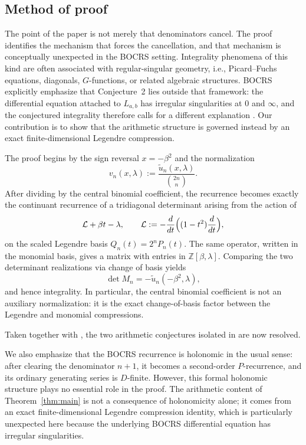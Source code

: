 \documentclass[11pt,letterpaper]{amsart}
\numberwithin{equation}{section}
\theoremstyle{plain}
\theoremstyle{remark}
\newcommand{\Z}{\mathbb{Z}}
\begin{document}
\subsection*{Method of proof}
The point of the paper is not merely that denominators cancel. The proof identifies the
mechanism that forces the cancellation, and that mechanism is conceptually unexpected in the
BOCRS setting. Integrality phenomena of this kind are often associated with regular-singular
geometry, i.e., Picard--Fuchs equations, diagonals, \(G\)-functions, or related algebraic
structures. BOCRS explicitly emphasize that Conjecture~2 lies outside that framework: the
differential equation attached to \(L_{a,b}\) has irregular singularities at \(0\) and
\(\infty\), and the conjectured integrality therefore calls for a different explanation
\cite[\S4,\S10.3]{BOCRS}. Our contribution is to show that the arithmetic structure is
governed instead by an exact finite-dimensional Legendre compression.

The proof begins by the sign reversal \(x=-\beta^2\) and the normalization
\[
v_n(x,\lambda):=\frac{\widetilde u_n(x,\lambda)}{\binom{2n}{n}}.
\]
After dividing by the central binomial coefficient, the recurrence becomes exactly the
continuant recurrence of a tridiagonal determinant arising from the action of
\[
\mathcal L+\beta t-\lambda,
\qquad
\mathcal L:=-\frac{d}{dt}\Bigl((1-t^2)\frac{d}{dt}\Bigr),
\]
on the scaled Legendre basis \(Q_n(t)=2^nP_n(t)\). The same operator, written in the monomial
basis, gives a matrix with entries in \(\Z[\beta,\lambda]\). Comparing the two determinant
realizations via change of basis yields
\[
\det M_n=-\widetilde u_n(-\beta^2,\lambda),
\]
and hence integrality. In particular, the central binomial coefficient is not an auxiliary
normalization: it is the exact change-of-basis factor between the Legendre and monomial
compressions.

Taken together with \cite{NguyenDangHB}, the two arithmetic conjectures isolated in
\cite[\S10.2--\S10.3]{BOCRS} are now resolved.

We also emphasize that the BOCRS recurrence is holonomic in the usual sense: after clearing the
denominator \(n+1\), it becomes a second-order \(P\)-recurrence, and its ordinary generating
series is \(D\)-finite. However, this formal holonomic structure plays no essential role in the
proof. The arithmetic content of Theorem~\ref{thm:main} is not a consequence of holonomicity
alone; it comes from an exact finite-dimensional Legendre compression identity, which is
particularly unexpected here because the underlying BOCRS differential equation has irregular
singularities.
\end{document}
